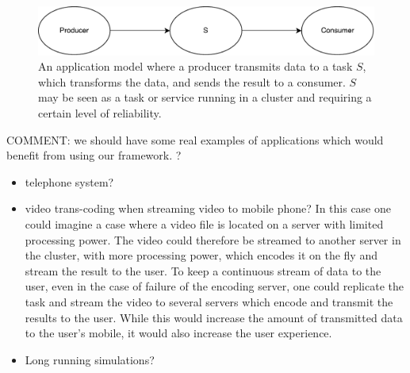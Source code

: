 \documentclass{cslthse-msc}
\begin{document}

\begin{figure}[!hbt]
\centering
\includegraphics[scale=0.5]{images/app_model.pdf} 
\caption{An application model where a producer transmits data to a task $S$, which transforms the data, and sends the result to a consumer. $S$ may be seen as a task or service running in a cluster and requiring a certain level of reliability.}\label{fig:app_model}
\end{figure}

COMMENT: we should have some real examples of applications which would benefit from using our framework. ?
\begin{itemize}
\item telephone system?
\item video trans-coding when streaming video to mobile phone? In this case one could imagine a case where a video file is located on a server with limited processing power. The video could therefore be streamed to another server in the cluster, with more processing power, which encodes it on the fly and stream the result to the user. To keep a continuous stream of data to the user, even in the case of failure of the encoding server, one could replicate the task and stream the video to several servers which encode and transmit the results to the user. While this would increase the amount of transmitted data to the user's mobile, it would also increase the user experience.
\item Long running simulations? \cite{relModelDistSimSystem}
\end{itemize}

\iffalse
\end{document}
